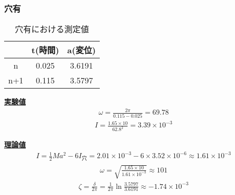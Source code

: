 \documentclass{jsarticle}
\begin{document}
  \subsubsection{穴有}
  \begin{table}[H]
   \begin{center}
    \begin{tabular}{|c||c|c|} \hline
        &t(時間) &a(変位) \\ \hline \hline
     n  &0.025  &3.6191   \\ \hline
     n+1&0.115  &3.5797   \\ \hline
    \end{tabular}
   \end{center}
   \caption{穴有における測定値}
   \label{tbl:ltx-tbl2}
  \end{table}
  \underline{\textbf{実験値}}\\  
  \begin{eqnarray}
   \omega=\frac{2\pi}{0.115-0.025}=69.78
  \end{eqnarray}
  \begin{eqnarray}
   I=\frac{1.65\times10}{62.8^2}=3.39\times10^{-3}
  \end{eqnarray}
  
  \underline{\textbf{理論値}}\\  
  \begin{eqnarray}
   I=\frac{1}{2}Ma^2-6I_{穴}=2.01\times10^{-3}-6\times3.52\times10^{-6}\approx1.61\times10^{-3}
  \end{eqnarray}
  \begin{eqnarray}
   \omega=\sqrt{\frac{1.65\times10}{1.61\times10^{-3}}}\approx101
  \end{eqnarray}
  \begin{eqnarray}
   \zeta=\frac{\delta}{2\pi}=\frac{1}{2\pi}\ln{\frac{3.5797}{3.6191}}\approx-1.74\times10^{-3}
  \end{eqnarray}
\end{document}

